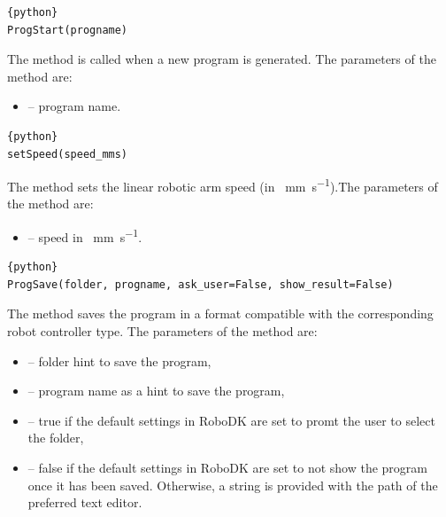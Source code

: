 \begin{lstlisting}[frame=lines,numbers=none,breaklines=true]{python}
ProgStart(progname)
\end{lstlisting}
The  method is called when a new program is generated. The parameters of the  method are:

\begin{itemize}

\item {} -- program name.

\end{itemize}

\begin{lstlisting}[frame=lines,numbers=none,breaklines=true]{python}
setSpeed(speed_mms)
\end{lstlisting}
The  method sets the linear robotic arm speed (in \SI{}{\mm\per\second}).The parameters of the   method are:

\begin{itemize}

\item {} -- speed in \SI{}{\mm\per\second}.

\end{itemize}

\begin{lstlisting}[frame=lines,numbers=none,breaklines=true]{python}
ProgSave(folder, progname, ask_user=False, show_result=False)
\end{lstlisting}
The  method saves the program in a format compatible with the corresponding robot controller type. The parameters of the  method are:

\begin{itemize}

\item {} -- folder hint to save the program,

\item {} -- program name as a hint to save the program,

\item {} -- true if the default settings in RoboDK are set to promt the user to select the folder, 

\item {} -- false if the default settings in RoboDK are set to not show the program once it has been saved. Otherwise, a string is provided with the path of the preferred text editor.

\end{itemize}

